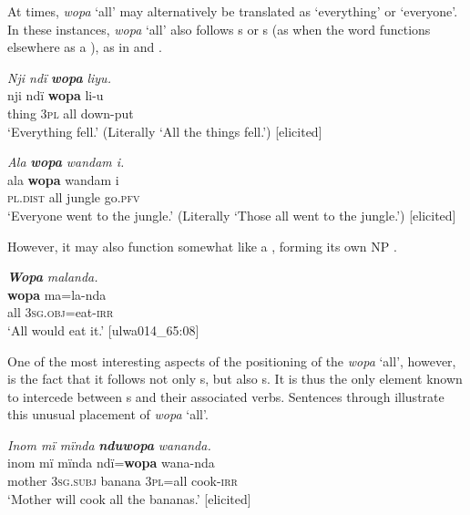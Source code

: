 At times, \textit{wopa} ‘all’ may alternatively be translated as ‘everything’ or ‘everyone’. In these instances, \textit{wopa} ‘all’ also follows s or s (as when the word functions elsewhere as a ), as in  and .

\ea%
    \label{ex:det:177}
          \textit{Nji ndï} \textbf{\textit{wopa}} \textit{liyu.}\\
\gll    nji    ndï  \textbf{wopa}  li-u\\
    thing  3\textsc{pl}  all    down-put\\
\glt `Everything fell.’ (Literally ‘All the things fell.’) [elicited]
\z

\ea%
    \label{ex:det:178}
          \textit{Ala} \textbf{\textit{wopa}} \textit{wandam i.}\\
\gll    ala      \textbf{wopa}  wandam  i\\
    \textsc{pl.dist}  all    jungle    go.\textsc{pfv}\\
\glt `Everyone went to the jungle.’ (Literally ‘Those all went to the jungle.’) [elicited]
\z



However, it may also function somewhat like a , forming its own NP .

\ea%
    \label{ex:det:179}
          \textbf{\textit{Wopa}} \textit{malanda.}\\
\gll    \textbf{wopa}  ma=la-nda\\
    all    \textsc{3sg.obj}=eat-\textsc{irr}\\
\glt `All would eat it.’ [ulwa014\_65:08]
\z

One of the most interesting aspects of the  positioning of the  \textit{wopa} ‘all’, however, is the fact that it follows not only s, but also s. It is thus the only element known to intercede between  s and their associated verbs. Sentences  through  illustrate this unusual placement of \textit{wopa} ‘all’.

\ea%
    \label{ex:det:180}
          \textit{Inom mï mïnda} \textbf{\textit{nduwopa}} \textit{wananda.}\\
\gll    inom  mï      mïnda  ndï=\textbf{wopa}  wana-nda\\
    mother  \textsc{3sg.subj}  banana  \textsc{3pl}=all  cook-\textsc{irr}\\
\glt `Mother will cook all the bananas.’ [elicited]
\z

